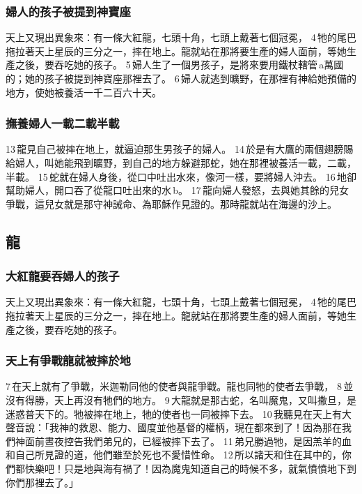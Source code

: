 \subsubsection{婦人的孩子被提到神寶座}
天上又現出異象來：有一條大紅龍，七頭十角，七頭上戴著七個冠冕， 4 牠的尾巴拖拉著天上星辰的三分之一，摔在地上。龍就站在那將要生產的婦人面前，等她生產之後，要吞吃她的孩子。 5 婦人生了一個男孩子，是將來要用鐵杖轄管 a萬國的；她的孩子被提到神寶座那裡去了。 6 婦人就逃到曠野，在那裡有神給她預備的地方，使她被養活一千二百六十天。

\subsubsection{撫養婦人一載二載半載}

13 龍見自己被摔在地上，就逼迫那生男孩子的婦人。 14 於是有大鷹的兩個翅膀賜給婦人，叫她能飛到曠野，到自己的地方躲避那蛇，她在那裡被養活一載，二載，半載。 15 蛇就在婦人身後，從口中吐出水來，像河一樣，要將婦人沖去。 16 地卻幫助婦人，開口吞了從龍口吐出來的水 b。 17 龍向婦人發怒，去與她其餘的兒女爭戰，這兒女就是那守神誡命、為耶穌作見證的。那時龍就站在海邊的沙上。


\subsection{龍}
\subsubsection{大紅龍要吞婦人的孩子}

天上又現出異象來：有一條大紅龍，七頭十角，七頭上戴著七個冠冕， 4 牠的尾巴拖拉著天上星辰的三分之一，摔在地上。龍就站在那將要生產的婦人面前，等她生產之後，要吞吃她的孩子。

\subsubsection{天上有爭戰龍就被摔於地}

7 在天上就有了爭戰，米迦勒同他的使者與龍爭戰。龍也同牠的使者去爭戰， 8 並沒有得勝，天上再沒有牠們的地方。 9 大龍就是那古蛇，名叫魔鬼，又叫撒旦，是迷惑普天下的。牠被摔在地上，牠的使者也一同被摔下去。 10 我聽見在天上有大聲音說：「我神的救恩、能力、國度並他基督的權柄，現在都來到了！因為那在我們神面前晝夜控告我們弟兄的，已經被摔下去了。 11 弟兄勝過牠，是因羔羊的血和自己所見證的道，他們雖至於死也不愛惜性命。 12 所以諸天和住在其中的，你們都快樂吧！只是地與海有禍了！因為魔鬼知道自己的時候不多，就氣憤憤地下到你們那裡去了。」



